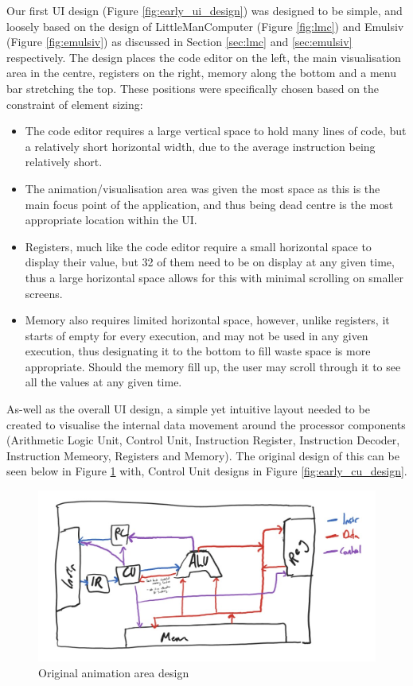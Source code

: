 Our first UI design (Figure \ref{fig:early_ui_design}) was designed to be simple, and loosely based on the design of LittleManComputer (Figure \ref{fig:lmc}) and Emulsiv (Figure \ref{fig:emulsiv}) as discussed in Section \ref{sec:lmc} and \ref{sec:emulsiv} respectively. 
The design places the code editor on the left, the main visualisation area in the centre, registers on the right, memory along the bottom and a menu bar stretching the top. These positions were specifically chosen based on the constraint of element sizing:
\begin{itemize}
    \item The code editor requires a large vertical space to hold many lines of code, but a relatively short horizontal width, due to the average instruction being relatively short.
    \item The animation/visualisation area was given the most space as this is the main focus point of the application, and thus being dead centre is the most appropriate location within the UI.
    \item Registers, much like the code editor require a small horizontal space to display their value, but 32 of them need to be on display at any given time, thus a large horizontal space allows for this with minimal scrolling on smaller screens.
    \item Memory also requires limited horizontal space, however, unlike registers, it starts of empty for every execution, and may not be used in any given execution, thus designating it to the bottom to fill waste space is more appropriate. Should the memory fill up, the user may scroll through it to see all the values at any given time.
\end{itemize}

As-well as the overall \ac{UI} design, a simple yet intuitive layout needed to be created to visualise the internal data movement around the processor components (Arithmetic Logic Unit, Control Unit, Instruction Register, Instruction Decoder, Instruction Memeory, Registers and Memory). The original design of this can be seen below in Figure \ref{fig:early_animation_design} with, Control Unit designs in Figure \ref{fig:early_cu_design}.

\begin{figure}[H]
    \centering
    \includegraphics[width=\linewidth]{dissertation/DATA/animation_layout.jpg}
    \caption{Original animation area design}
    \label{fig:early_animation_design}
\end{figure}

